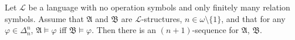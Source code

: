 Let $\mathcal{L}$ be a language with no operation symbols and only finitely many relation symbols. Assume that $\mathfrak{A}$ and $\mathfrak{B}$ are $\mathcal{L}$-structures, $n \in \omega \setminus \{1\}$, and that for any $\varphi \in \Delta_n^n$, $\mathfrak{A} \models \varphi$ iff $\mathfrak{B} \models \varphi$. Then there is an $(n + 1)$-sequence for $\mathfrak{A}$, $\mathfrak{B}$.
